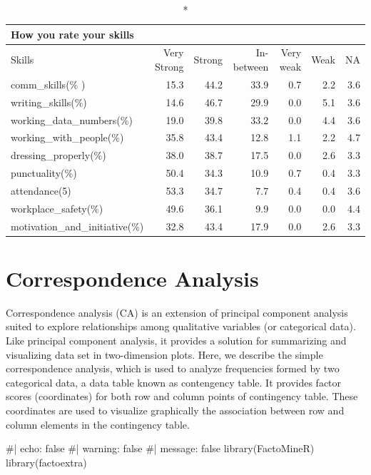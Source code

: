 \documentclass[
  12pt]{article}
\newenvironment{Shaded}{\begin{snugshade}}{\end{snugshade}}
\newcommand{\CommentTok}[1]{\textcolor[rgb]{0.37,0.37,0.37}{#1}}
\newcommand{\FunctionTok}[1]{\textcolor[rgb]{0.28,0.35,0.67}{#1}}
\newcommand{\NormalTok}[1]{\textcolor[rgb]{0.00,0.23,0.31}{#1}}
\begin{document}
\captionsetup[table]{labelformat=empty,skip=1pt}
\begin{longtable}{lrrrrrr}
\caption*{
{\large How you rate your skills}
} \\ 
\toprule
Skills & Very Strong & Strong & In-between & Very weak & Weak & NA \\ 
\midrule
comm\_skills(\% ) & 15.3 & 44.2 & 33.9 & 0.7 & 2.2 & 3.6 \\ 
writing\_skills(\%) & 14.6 & 46.7 & 29.9 & 0.0 & 5.1 & 3.6 \\ 
working\_data\_numbers(\%) & 19.0 & 39.8 & 33.2 & 0.0 & 4.4 & 3.6 \\ 
working\_with\_people(\%) & 35.8 & 43.4 & 12.8 & 1.1 & 2.2 & 4.7 \\ 
dressing\_properly(\%) & 38.0 & 38.7 & 17.5 & 0.0 & 2.6 & 3.3 \\ 
punctuality(\%) & 50.4 & 34.3 & 10.9 & 0.7 & 0.4 & 3.3 \\ 
attendance(5) & 53.3 & 34.7 & 7.7 & 0.4 & 0.4 & 3.6 \\ 
workplace\_safety(\%) & 49.6 & 36.1 & 9.9 & 0.0 & 0.0 & 4.4 \\ 
motivation\_and\_initiative(\%) & 32.8 & 43.4 & 17.9 & 0.0 & 2.6 & 3.3 \\ 
\bottomrule
\end{longtable}

\hypertarget{correspondence-analysis}{%
\section{Correspondence Analysis}\label{correspondence-analysis}}

Correspondence analysis (CA) is an extension of principal component
analysis suited to explore relationships among qualitative variables (or
categorical data). Like principal component analysis, it provides a
solution for summarizing and visualizing data set in two-dimension
plots. Here, we describe the simple correspondence analysis, which is
used to analyze frequencies formed by two categorical data, a data table
known as contengency table. It provides factor scores (coordinates) for
both row and column points of contingency table. These coordinates are
used to visualize graphically the association between row and column
elements in the contingency table.

\begin{Shaded}
\begin{Highlighting}[]
\CommentTok{\#| echo: false}
\CommentTok{\#| warning: false}
\CommentTok{\#| message: false}
\FunctionTok{library}\NormalTok{(FactoMineR)}
\FunctionTok{library}\NormalTok{(factoextra)}
\end{Highlighting}
\end{Shaded}
\end{document}
